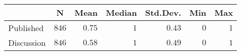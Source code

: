 \begin{center}
\begin{tabular}{lrrrrrr}
\toprule
\multicolumn{1}{l}{}&\multicolumn{1}{c}{N}&\multicolumn{1}{c}{Mean}&\multicolumn{1}{c}{Median}&\multicolumn{1}{c}{Std.Dev.}&\multicolumn{1}{c}{Min}&\multicolumn{1}{c}{Max}\tabularnewline
\midrule
Published&$846$&$0.75$&$1$&$0.43$&$0$&$1$\tabularnewline
Discussion&$846$&$0.58$&$1$&$0.49$&$0$&$1$\tabularnewline
\bottomrule
\end{tabular}\end{center}
